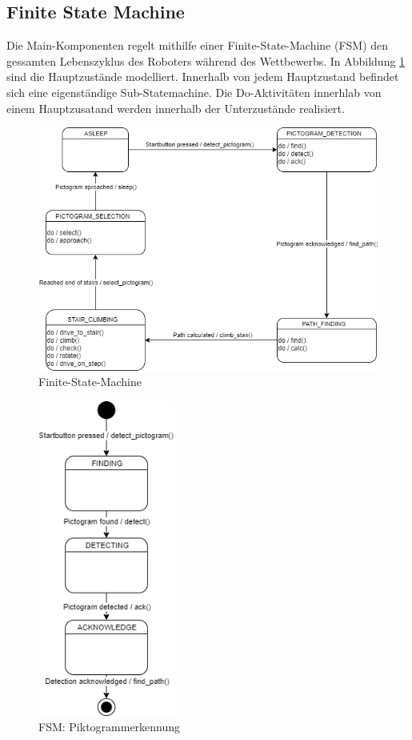 \subsection{Finite State Machine}
\label{sec:fsm}
Die Main-Komponenten regelt mithilfe einer Finite-State-Machine (FSM) den gessamten Lebenszyklus des Roboters während des Wettbewerbs. In Abbildung \ref{fig:fsm} sind die Hauptzustände modelliert. Innerhalb von jedem Hauptzustand befindet sich eine eigenständige Sub-Statemachine. Die Do-Aktivitäten innerhlab von einem Hauptzusatand werden innerhalb der Unterzustände realisiert. 

\begin{figure}[H]
  \includegraphics[width=1\textwidth]{img/softwarearchitektur/FSM-FSM.png}
  \centering
  \caption{Finite-State-Machine}
  \label{fig:fsm}
\end{figure}

\begin{figure}[H]
  \includegraphics[width=0.40\textwidth]{img/softwarearchitektur/FSM-PICTOGRAM_DETECTION.png}
  \centering
  \caption{FSM: Piktogrammerkennung}
  \label{fig:fsm-pictogrammdetection}
\end{figure}


